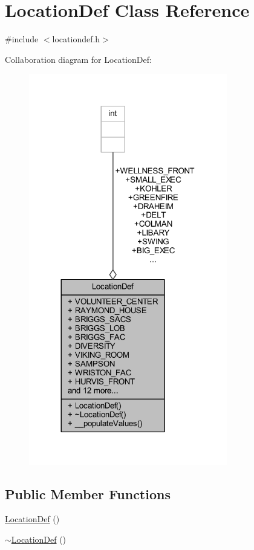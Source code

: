\hypertarget{class_location_def}{}\section{Location\+Def Class Reference}
\label{class_location_def}


{\ttfamily \#include $<$locationdef.\+h$>$}



Collaboration diagram for Location\+Def\+:
\nopagebreak
\begin{figure}[H]
\begin{center}
\leavevmode
\includegraphics[width=245pt]{class_location_def__coll__graph}
\end{center}
\end{figure}
\subsection*{Public Member Functions}
\begin{DoxyCompactItemize}
\item 
\hyperlink{class_location_def_ab5b514c67483bebd39dc6ef82cd22432}{Location\+Def} ()
\item 
\hyperlink{class_location_def_a977cf461bb7bd8ccb2c7c31558b90886}{$\sim$\+Location\+Def} ()
\end{DoxyCompactItemize}
